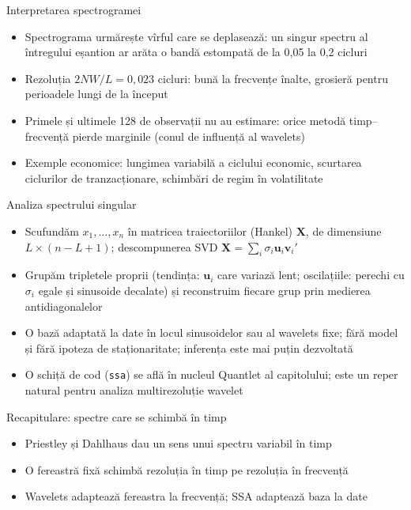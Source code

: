\begin{frame}{Interpretarea spectrogramei}
\itemsize{\small}
\begin{itemize}
    \item Spectrograma urmărește vîrful care se deplasează: un singur spectru al întregului eșantion ar arăta o bandă estompată de la 0,05 la 0,2 cicluri
    \item Rezoluția $2NW/L = 0{,}023$ cicluri: bună la frecvențe înalte, grosieră pentru perioadele lungi de la început
    \item Primele și ultimele 128 de observații nu au estimare: orice metodă timp--frecvență pierde marginile (conul de influență al wavelets)
    \item Exemple economice: lungimea variabilă a ciclului economic, scurtarea ciclurilor de tranzacționare, schimbări de regim în volatilitate
\end{itemize}
\end{frame}

\begin{frame}{Analiza spectrului singular}
\itemsize{\small}
\begin{itemize}
    \item Scufundăm $x_1, \dots, x_n$ în matricea traiectoriilor (Hankel) $\mathbf X$, de dimensiune $L \times (n - L + 1)$; descompunerea SVD $\mathbf X = \sum_i\sigma_i\mathbf u_i\mathbf v_i'$ 
    \item Grupăm tripletele proprii (tendința: $\mathbf u_i$ care variază lent; oscilațiile: perechi cu $\sigma_i$ egale și sinusoide decalate) și reconstruim fiecare grup prin medierea antidiagonalelor
    \item O bază adaptată la date în locul sinusoidelor sau al wavelets fixe; fără model și fără ipoteza de staționaritate; inferența este mai puțin dezvoltată
    \item O schiță de cod (\texttt{ssa}) se află în nucleul Quantlet al capitolului; este un reper natural pentru analiza multirezoluție wavelet
\end{itemize}
\end{frame}

\begin{frame}{Recapitulare: spectre care se schimbă în timp}
\itemsize{\small}
\begin{itemize}
    \item Priestley și Dahlhaus dau un sens unui spectru variabil în timp
    \item O fereastră fixă schimbă rezoluția în timp pe rezoluția în frecvență
    \item Wavelets adaptează fereastra la frecvență; SSA adaptează baza la date
\end{itemize}
\end{frame}


